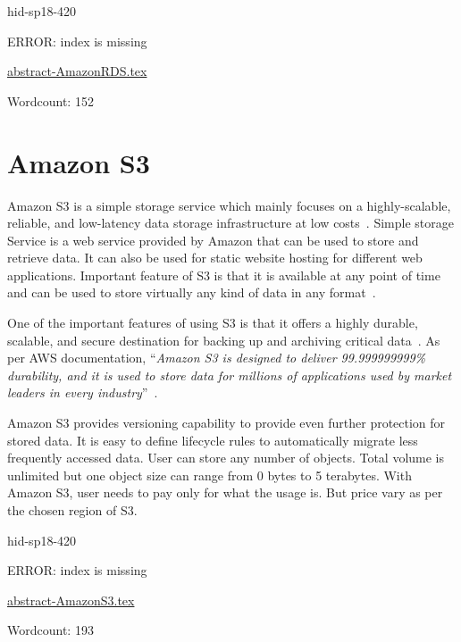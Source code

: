 \begin{IU}

hid-sp18-420

ERROR: index is missing

\href{https://github.com/cloudmesh-community/hid-sp18-420/blob/master//technology/abstract-AmazonRDS.tex}{abstract-AmazonRDS.tex}

 

Wordcount: 152

\end{IU}

\section{Amazon S3}

Amazon S3 is a simple storage service which mainly focuses on a highly-scalable,
reliable, and low-latency data storage infrastructure at low
costs~\cite{hid-sp18-420-amazon-S3-FAQ}. Simple storage Service is a web service
provided by Amazon that can be used to store and retrieve data. It can also be
used for static website hosting for different web applications. Important
feature of S3 is that it is available at any point of time and can be used to
store virtually any kind of data in any
format~\cite{hid-sp18-420-amazon-S3-FAQ}.

One of the important features of using S3 is that it offers a highly durable,
scalable, and secure destination for backing up and archiving critical
data~\cite{hid-sp18-420-amazon-S3}. As per AWS documentation, \color{blue}``\emph{Amazon S3 is
designed to deliver 99.999999999\% durability, and it is used to store data for
millions of applications used by market leaders in every
industry}''\color{black}~\cite{hid-sp18-420-amazon-S3}.

Amazon S3 provides versioning capability to provide even further protection for
stored data. It is easy to define lifecycle rules to automatically migrate less
frequently accessed data. User can store any number of objects. Total volume is
unlimited but one object size can range from 0 bytes to 5 terabytes. With Amazon
S3, user needs to pay only for what the usage is. But price vary as per the
chosen region of S3.


\begin{IU}

hid-sp18-420

ERROR: index is missing

\href{https://github.com/cloudmesh-community/hid-sp18-420/blob/master//technology/abstract-AmazonS3.tex}{abstract-AmazonS3.tex}

 

Wordcount: 193

\end{IU}

